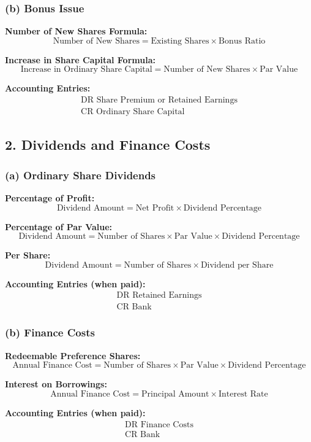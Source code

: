 \subsubsection*{(b) Bonus Issue}

\textbf{Number of New Shares Formula:}
\[
\text{Number of New Shares} = \text{Existing Shares} \times \text{Bonus Ratio}
\]

\textbf{Increase in Share Capital Formula:}
\[
\text{Increase in Ordinary Share Capital} = \text{Number of New Shares} \times \text{Par Value}
\]

\textbf{Accounting Entries:}
\[
\begin{aligned}
\text{DR Share Premium or Retained Earnings} \\
\text{CR Ordinary Share Capital}
\end{aligned}
\]

\subsection*{2. Dividends and Finance Costs}

\subsubsection*{(a) Ordinary Share Dividends}

\textbf{Percentage of Profit:}
\[
\text{Dividend Amount} = \text{Net Profit} \times \text{Dividend Percentage}
\]

\textbf{Percentage of Par Value:}
\[
\text{Dividend Amount} = \text{Number of Shares} \times \text{Par Value} \times \text{Dividend Percentage}
\]

\textbf{Per Share:}
\[
\text{Dividend Amount} = \text{Number of Shares} \times \text{Dividend per Share}
\]

\textbf{Accounting Entries (when paid):}
\[
\begin{aligned}
\text{DR Retained Earnings} \\
\text{CR Bank}
\end{aligned}
\]

\subsubsection*{(b) Finance Costs}

\textbf{Redeemable Preference Shares:}
\[
\text{Annual Finance Cost} = \text{Number of Shares} \times \text{Par Value} \times \text{Dividend Percentage}
\]

\textbf{Interest on Borrowings:}
\[
\text{Annual Finance Cost} = \text{Principal Amount} \times \text{Interest Rate}
\]

\textbf{Accounting Entries (when paid):}
\[
\begin{aligned}
\text{DR Finance Costs} \\
\text{CR Bank}
\end{aligned}
\]
